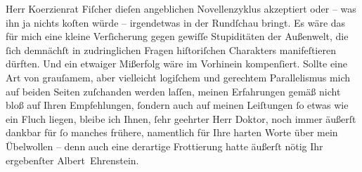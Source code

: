\begin{ledgroupsized}[t]{13cm}
               Herr Ko{\geminationm}erzienrat Fiſcher dieſen angeblichen Novellenzyklus akzeptiert oder – was ihn ja
               nichts koſten würde – irgendetwas in der Rundſchau bringt. Es wäre das für mich eine kleine Verſicherung gegen
               gewiſſe Stupiditäten der Außenwelt, die ſich demnächſt in zudringlichen Fragen
               hiſtoriſchen Charakters manifeſtieren dürften.\pend
           \pstart
           {\pb}Und ein etwaiger Mißerfolg wäre im
               Vorhinein kompenſiert.\pend
           \pstart
           Sollte eine Art von grauſamem, aber vielleicht logiſchem und gerechtem Parallelismus
               mich auf beiden Seiten zuſchanden werden laſſen, meinen Erfahrungen gemäß nicht bloß
               auf Ihren Empfehlungen, ſondern auch auf meinen Leiſtungen ſo etwas wie ein Fluch
               liegen, bleibe ich Ihnen, ſehr geehrter Herr Doktor, noch immer äußerſt dankbar für
               ſo manches frühere, namentlich für Ihre harten Worte über mein Übelwollen – denn auch
               eine derartige Frottierung hatte äußerſt nötig Ihr ergebenſter\pend
           \pstart \spacefill\mbox{Albert Ehrenstein.}\pend{}
         
         \endnumbering{}\end{ledgroupsized}  \newcommand{\dateiname}{L01884}\newcommand{\titel}{Albert Ehrenstein an Arthur Schnitzler, 6. 11. 1909}\newcommand{\editorInnen}{Martin Anton Müller und Gerd-Hermann Susen}
      